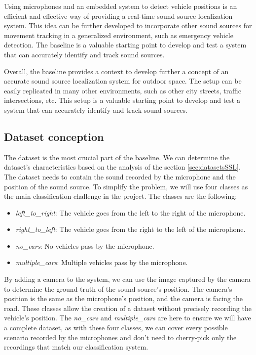 Using microphones and an embedded system to detect vehicle positions is an efficient and effective way of providing a real-time sound source localization system. This idea can be further developed to incorporate other sound sources for movement tracking in a generalized environment, such as emergency vehicle detection. The baseline is a valuable starting point to develop and test a system that can accurately identify and track sound sources.

Overall, the baseline provides a context to develop further a concept of an accurate sound source localization system for outdoor space. The setup can be easily replicated in many other environments, such as other city streets, traffic intersections, etc. This setup is a valuable starting point to develop and test a system that can accurately identify and track sound sources.

\subsection{Dataset conception}

The dataset is the most crucial part of the baseline. We can determine the dataset's characteristics based on the analysis of the section \ref{sec:datasetsSSL}. The dataset needs to contain the sound recorded by the microphone and the position of the sound source. To simplify the problem, we will use four classes as the main classification challenge in the project. The classes are the following:

\begin{itemize}
    \item  \textit{left\_to\_right}: The vehicle goes from the left to the right of the microphone.
    \item  \textit{right\_to\_left}:  The vehicle goes from the right to the left of the microphone.
    \item  \textit{no\_cars}:  No vehicles pass by the microphone.
    \item  \textit{multiple\_cars}:  Multiple vehicles pass by the microphone.
\end{itemize}

By adding a camera to the system, we can use the image captured by the camera to determine the ground truth of the sound source's position. The camera's position is the same as the microphone's position, and the camera is facing the road. These classes allow the creation of a dataset without precisely recording the vehicle's position. The \textit{no\_cars} and \textit{multiple\_cars} are here to ensure we will have a complete dataset, as with these four classes, we can cover every possible scenario recorded by the microphones and don't need to cherry-pick only the recordings that match our classification system. 

